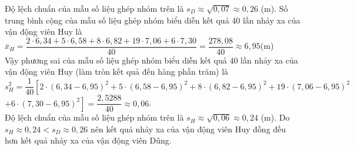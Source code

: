 \begin{ex}
{\begin{itemchoice}
		Độ lệch chuẩn của mẫu số liệu ghép  nhóm trên là $s_D\approx\sqrt{0{,}07}\approx 0{,}26$ (m).
		\itemch Số trung bình cộng của mẫu số liệu ghép nhóm biểu diễn kết quả  40 lần nhảy xa của vận động viên Huy là\\
		$\overline{x}_H=\dfrac{2\cdot 6{,}34+5\cdot 6{,}58+8\cdot 6{,}82+19\cdot 7{,}06+6\cdot 7{,}30}{40}=\dfrac{278{,}08}{40}\approx 6{,}95$(m)\\ 
		Vậy phương sai của mẫu số liệu ghép nhóm biểu diễn kết quả 40 lần nhảy xa của vận động viên Huy (làm tròn kết quả đến hàng  phần trăm) là\\
		$ s_H^2=\dfrac{1}{40}\left[2\cdot \left(6{,}34-6{,}95\right)^2+5\cdot \left(6{,}58-6{,}95\right)^2+8\cdot  \left(6{,}82-6{,}95\right)^2+19\cdot \left(7{,}06-6{,}95\right)^2\right.$\\
		 $\left.+6\cdot \left(7{,}30-6{,}95\right)^2\right]=\dfrac{2{,}5288}{40}\approx 0{,}06$.\\
		Độ lệch chuẩn  của mẫu số liệu ghép nhóm trên là $s_H\approx\sqrt{0{,}06}\approx 0{,}24$ (m).
		\itemch Do $s_H\approx 0{,}24<s_D\approx 0{,}26$ nên kết quả nhảy xa của vận động viên Huy đồng đều hơn kết quả nhảy xa của vận động viên Dũng. 
	\end{itemchoice}
} 
\end{ex}

